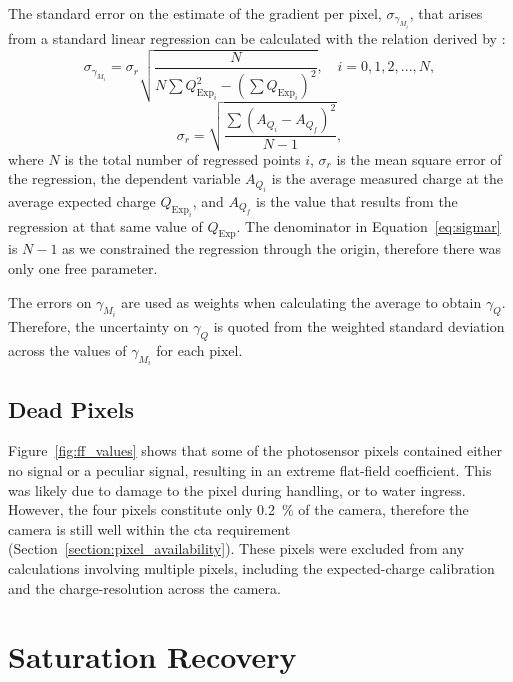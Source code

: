 The standard error on the estimate of the gradient per pixel, $\sigma_{\gamma_{M_i}}$, that arises from a standard linear regression can be calculated with the relation derived by \textcite{Taylor1997}:
\begin{equation} \label{eq:merr}
\sigma_{\gamma_{M_i}} = \sigma_r \sqrt{\frac{N}{N \sum Q_{\text{Exp}_i}^2 - (\sum Q_{\text{Exp}_i})^2}}, \quad i = 0, 1, 2, ..., N,
\end{equation}
\begin{equation} \label{eq:sigmar}
\sigma_r = \sqrt{\frac{\sum (A_{Q_i} - A_{Q_f})^2}{N - 1}},
\end{equation}
where $N$ is the total number of regressed points $i$, $\sigma_r$ is the mean square error of the regression, the dependent variable $A_{Q_i}$ is the average measured charge at the average expected charge $Q_{\text{Exp}_i}$, and $A_{Q_f}$ is the value that results from the regression at that same value of $Q_\text{Exp}$. The denominator in Equation~\ref{eq:sigmar} is $N-1$ as we constrained the regression through the origin, therefore there was only one free parameter.

The errors on $\gamma_{M_i}$ are used as weights when calculating the average to obtain $\gamma_Q$. Therefore, the uncertainty on $\gamma_Q$ is quoted from the weighted standard deviation across the values of $\gamma_{M_i}$ for each pixel.

\subsection{Dead Pixels}

Figure~\ref{fig:ff_values} shows that some of the photosensor pixels contained either no signal or a peculiar signal, resulting in an extreme flat-field coefficient. This was likely due to damage to the pixel during handling, or to water ingress. However, the four pixels constitute only \SI{0.2}{\percent} of the camera, therefore the camera is still well within the  \gls{cta} requirement (Section~\ref{section:pixel_availability}). These pixels were excluded from any calculations involving multiple pixels, including the expected-charge calibration and the charge-resolution across the camera. 

\section{Saturation Recovery} \label{section:saturation}

